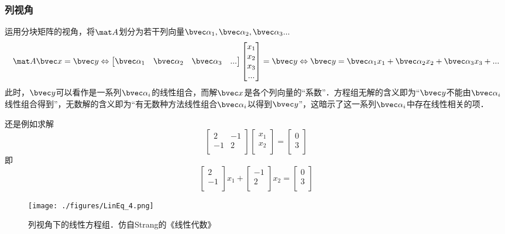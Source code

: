 \subsubsection{列视角}
运用分块矩阵的视角，将$\mat A$划分为若干列向量$\bvec \alpha_1, \bvec \alpha_2,\bvec \alpha_3...$
$$
\mat A \bvec x=\bvec y \Leftrightarrow 
\begin{bmatrix}
\bvec \alpha_1& \bvec \alpha_2& \bvec \alpha_3&...
\end{bmatrix}
\begin{bmatrix}
x_{1}\\
x_{2}\\
x_{3}\\
...\\
\end{bmatrix}
=
\bvec y
\Leftrightarrow 
\bvec y = \bvec \alpha_1 x_1+\bvec \alpha_2 x_2+\bvec \alpha_3 x_3+...
$$
此时，$\bvec y$可以看作是一系列$\bvec \alpha_i$的线性组合，而解$\bvec x$是各个列向量的“系数”．方程组无解的含义即为“$\bvec y$不能由$\bvec \alpha_i$线性组合得到”，无数解的含义即为“有无数种方法线性组合$\bvec \alpha_i$以得到$\bvec y$”，这暗示了这一系列$\bvec \alpha_i$中存在线性相关的项．

\begin{example}{}
还是例如求解
$$
\begin{bmatrix}
2&-1\\
-1&2\\
\end{bmatrix}
\begin{bmatrix}
x_1\\
x_2\\
\end{bmatrix}
=
\begin{bmatrix}
0\\
3\\
\end{bmatrix}
$$
即
$$
\begin{bmatrix}
2\\
-1\\
\end{bmatrix}
x_1
+
\begin{bmatrix}
-1\\
2\\
\end{bmatrix}
x_2
=
\begin{bmatrix}
0\\
3\\
\end{bmatrix}
$$
\begin{figure}[ht]
\centering
\texttt{[image: ./figures/LinEq\_4.png]}
\caption{列视角下的线性方程组．仿自Strang的《线性代数》} \label{LinEq_fig4}
\end{figure}
\end{example}



